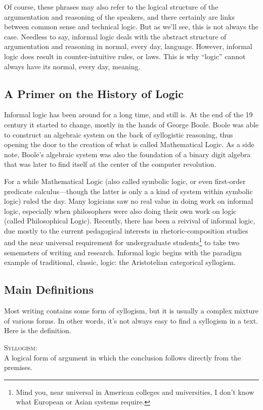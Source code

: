 \documentclass{article}
\begin{document}
Of course, these phrases may also refer to the logical structure of the argumentation and reasoning of the speakers, and there certainly are links between common sense and technical logic. But as we'll see, this is not always the case. Needless to say, informal logic deals with the abstract structure of argumentation and reasoning in normal, every day, language. However, informal logic does result in counter-intuitive rules, or laws. This is why ``logic'' cannot always have its normal, every day, meaning.

\subsection{A Primer on the History of Logic}
Informal logic has been around for a long time, and still is. At the end of the 19 century it started to change, mostly in the hands of George Boole. Boole was able to construct an algebraic system on the back of syllogistic reasoning, thus opening the door to the creation of what is called Mathematical Logic. As a side note, Boole's algebraic system was also the foundation of a binary digit algebra that was later to find itself at the center of the computer revolution.

For a while Mathematical Logic (also called symbolic logic, or even first-order predicate calculus---though the latter is only a a kind of system within symbolic logic) ruled the day. Many logicians saw no real value in doing work on informal logic, especially when philosophers were also doing their own work on logic (called Philosophical Logic). Recently, there has been a reivival of informal logic, due mostly to the current pedagogical interests in rhetoric-composition studies and the near universal requirement for undergraduate students\footnote{Mind you, near universal in American colleges and universities, I don't know what European or Asian systems require.} to take two sememsters of writing and research. Informal logic begins with the paradigm example of traditional, classic, logic: the Aristotelian categorical syllogism.


\subsection{Main Definitions}
Most writing contains some form of syllogism, but it is usually a complex mixture of various forms. In other words, it's not always easy to find a syllogism in a text. Here is the definition.

\begin{definition}\label{syllogism}
\textsc{Syllogism}:\\
A logical form of argument in which the conclusion follows directly from the premises.
\end{definition}
\end{document}
